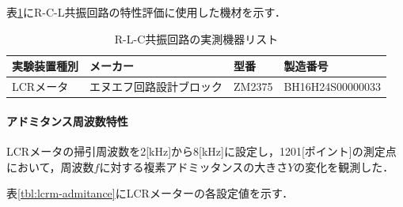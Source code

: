 \documentclass[dvipdfmx,titlepage,a4j]{jsarticle}  %
\numberwithin{equation}{section}
\begin{document}
表\ref{tbl:r-l-c-list}にR-C-L共振回路の特性評価に使用した機材を示す．

\begin{table}[htbp]
  \caption{R-L-C共振回路の実測機器リスト}
  \begin{center}
    \begin{tabular}{l|l|l|l}
      \hline
      実験装置種別 & メーカー                 & 型番   & 製造番号         \\ \hline \hline
      LCRメータ    & エヌエフ回路設計ブロック & ZM2375 & BH16H24S00000033 \\ \hline
    \end{tabular}
  \end{center}
  \label{tbl:r-l-c-list}
\end{table}


\paragraph{アドミタンス周波数特性}
LCRメータの掃引周波数を2[kHz]から8[kHz]に設定し，1201[ポイント]の測定点において，周波数$f$に対する複素アドミッタンスの大きさ$Y$の変化を観測した．

表\ref{tbl:lcrm-admitance}にLCRメーターの各設定値を示す．
\end{document}
